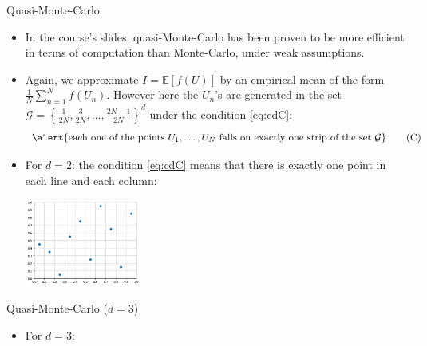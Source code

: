 \documentclass[aspectratio=169,xcolor=dvipsnames]{beamer}
\begin{document}
    \begin{frame}{Quasi-Monte-Carlo}
        \begin{itemize}
            \item<1-> In the course's slides, quasi-Monte-Carlo has been proven to be more efficient in terms of computation than Monte-Carlo, under weak assumptions.

            \item<2-> Again, we approximate $I = \mathbb{E}[f(U)]$ by an empirical mean of the form $\frac{1}{N} \sum_{n = 1}^N f(U_n)$. However here the $U_n$'s are generated in the set $\mathcal G = \left\{\frac{1}{2N}, \frac{3}{2N}, \dots, \frac{2N - 1}{2N}\right\}^d$ under the condition \eqref{eq:cdC}:
            \begin{equation}
                \alert{\text{each one of the points } U_1, \dots, U_N \text{ falls on exactly one strip of the set } \mathcal G} \tag{C}\label{eq:cdC}
            \end{equation}

            \item<3-> For $d = 2$: the condition \eqref{eq:cdC} means that there is exactly one point in each line and each column:
            \begin{center}
                \includegraphics[width=0.3\textwidth]{points2.png}
            \end{center}
        \end{itemize}
    \end{frame}

    \begin{frame}{Quasi-Monte-Carlo ($d = 3$)}
        \begin{itemize}
            \item For $d = 3$: %
        \end{itemize}
    \end{frame}
\end{document}

